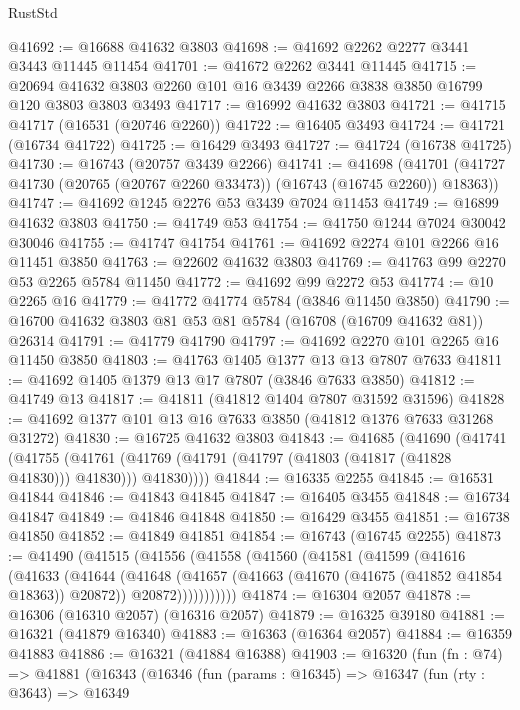 \begin{lexlean}{RustStd}
\begin{coremodule}
@41692 := @16688 @41632 @3803
@41698 := @41692 @2262 @2277 @3441 @3443 @11445 @11454
@41701 := @41672 @2262 @3441 @11445
@41715 := @20694 @41632 @3803 @2260 @101 @16 @3439 @2266 @3838 @3850 @16799 @120 @3803 @3803 @3493
@41717 := @16992 @41632 @3803
@41721 := @41715 @41717 (@16531 (@20746 @2260))
@41722 := @16405 @3493
@41724 := @41721 (@16734 @41722)
@41725 := @16429 @3493
@41727 := @41724 (@16738 @41725)
@41730 := @16743 (@20757 @3439 @2266)
@41741 := @41698
    (@41701 (@41727 @41730 (@20765 (@20767 @2260 @33473)) (@16743 (@16745 @2260)) @18363))
@41747 := @41692 @1245 @2276 @53 @3439 @7024 @11453
@41749 := @16899 @41632 @3803
@41750 := @41749 @53
@41754 := @41750 @1244 @7024 @30042 @30046
@41755 := @41747 @41754
@41761 := @41692 @2274 @101 @2266 @16 @11451 @3850
@41763 := @22602 @41632 @3803
@41769 := @41763 @99 @2270 @53 @2265 @5784 @11450
@41772 := @41692 @99 @2272 @53
@41774 := @10 @2265 @16
@41779 := @41772 @41774 @5784 (@3846 @11450 @3850)
@41790 := @16700 @41632 @3803 @81 @53 @81 @5784 (@16708 (@16709 @41632 @81)) @26314
@41791 := @41779 @41790
@41797 := @41692 @2270 @101 @2265 @16 @11450 @3850
@41803 := @41763 @1405 @1377 @13 @13 @7807 @7633
@41811 := @41692 @1405 @1379 @13 @17 @7807 (@3846 @7633 @3850)
@41812 := @41749 @13
@41817 := @41811 (@41812 @1404 @7807 @31592 @31596)
@41828 := @41692 @1377 @101 @13 @16 @7633 @3850 (@41812 @1376 @7633 @31268 @31272)
@41830 := @16725 @41632 @3803
@41843 := @41685
    (@41690
      (@41741
        (@41755
          (@41761 (@41769 (@41791 (@41797 (@41803 (@41817 (@41828 @41830))) @41830))) @41830))))
@41844 := @16335 @2255
@41845 := @16531 @41844
@41846 := @41843 @41845
@41847 := @16405 @3455
@41848 := @16734 @41847
@41849 := @41846 @41848
@41850 := @16429 @3455
@41851 := @16738 @41850
@41852 := @41849 @41851
@41854 := @16743 (@16745 @2255)
@41873 := @41490
    (@41515
      (@41556
        (@41558
          (@41560
            (@41581
              (@41599
                (@41616
                  (@41633
                    (@41644
                      (@41648
                        (@41657
                          (@41663 (@41670 (@41675 (@41852 @41854 @18363)) @20872))
                          @20872)))))))))))
@41874 := @16304 @2057
@41878 := @16306 (@16310 @2057) (@16316 @2057)
@41879 := @16325 @39180
@41881 := @16321 (@41879 @16340)
@41883 := @16363 (@16364 @2057)
@41884 := @16359 @41883
@41886 := @16321 (@41884 @16388)
@41903 := @16320
    (fun (fn : @74) =>
    @41881
      (@16343
        (@16346
          (fun (params : @16345) =>
          @16347
            (fun (rty : @3643) =>
            @16349

\end{coremodule}
\end{lexlean}
